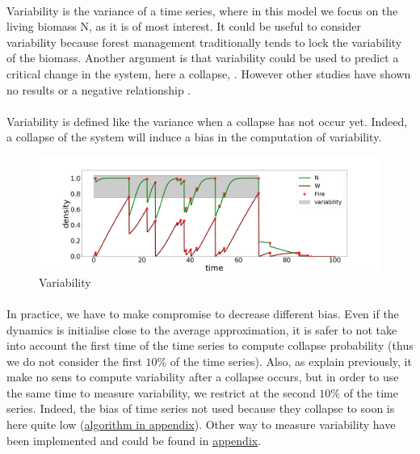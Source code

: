 \documentclass{article}
\begin{document}
\label{variability}
\paragraph{}
Variability is the variance of a time series, where in this model we focus on the living biomass N, as it is of most interest. It could be useful to consider variability because forest management traditionally tends to lock the variability \citep{bergeron_natural_2002} of the biomass. Another argument is that variability could be used to predict a critical change in the system, here a collapse, \citep{karr_population_1982, pimm_risk_1988, bengtsson_predicting_1995}. However other studies have shown no results \citep{bengtsson_interspecific_1989, pollard_extinction_1992} or a negative relationship \citep{lima_extinction_1996}.





\paragraph{}
Variability is defined like the variance when a collapse has not occur yet. Indeed, a collapse of the system will induce a bias in the computation of variability.


\begin{figure}[h!]
\centering
\includegraphics[width=12.cm]{time_series_sd_1.png}
\caption{Variability}
\end{figure}



\paragraph{}
In practice, we have to make compromise to decrease different bias. Even if the dynamics is initialise close to the average approximation, it is safer to not take into account the first time of the time series to compute collapse probability (thus we do not consider the first $10\%$ of the time series). Also, as explain previously, it make no sens to compute variability after a collapse occurs, but in order to use the same time to measure variability, we restrict at the second $10\%$ of the time series. Indeed, the bias of time series not used because they collapse to soon is here quite low (\hyperref[algo_variability]{algorithm in appendix}). Other way to measure variability have been implemented and could be found in \hyperref[other_variability]{appendix}.
\end{document}
